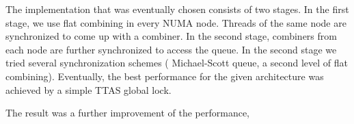 The implementation that was eventually chosen  consists of two stages. In the first stage, we use flat combining in every NUMA node. Threads of the same node are synchronized to come up with a combiner. In the second stage, combiners from each node are further synchronized to access the queue. In the second stage we tried several synchronization schemes ( Michael-Scott queue, a second level of flat combining). Eventually, the best performance for the given architecture was achieved by a simple TTAS global lock.

The result was a further improvement of the performance,

